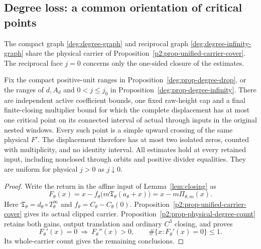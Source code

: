 \subsection{Degree loss: a common orientation of critical points}
\label{sharp:upper-degree-section}

The compact graph \eqref{deg:degree-graph} and reciprocal graph
\eqref{deg:degree-infinity-graph} share the physical carrier of
Proposition~\ref{p2:prop-unified-carrier-cover}. The reciprocal face
\(j=0\) concerns only the one-sided closure of the estimates.

\begin{proposition}
\label{sharp:upper-degree}
Fix the compact positive-unit ranges in
Proposition~\ref{deg:prop-degree-drop}, or the ranges of \(d,A_d\) and
\(0<j\le j_0\) in Proposition~\ref{deg:prop-degree-infinity}.
There are independent active coefficient bounds, one fixed raw-height
cap and a final finite-closing multiplier bound for which the complete
displacement has at most one critical point on its connected interval
of actual through inputs in the original nested windows.
Every such point is a simple upward crossing of the same physical
\(F'\). The displacement therefore has at most two isolated zeros,
counted with multiplicity, and no identity interval.
All estimates hold at every retained input, including nonclosed
through orbits and positive divider equalities. They are uniform for
physical \(j>0\) as \(j\downarrow0\).
\end{proposition}

\begin{proof}
Write the return in the affine input of Lemma~\ref{lem:closing} as
\begin{equation}\label{sharp:upper-degree-displacement}
 F_\theta(x)=x-f_\theta\bigl(m\mathfrak T_\theta(a_\theta+x)\bigr)
             =x-m\Pi_{\theta,m}(x).
\end{equation}
Here $\mathfrak T_\theta=d_\theta\circ T_\theta^\infty$ and
$f_\theta=C_\theta-C_\theta(0)$.
Proposition~\ref{p2:prop-unified-carrier-cover} gives its actual
clipped carrier. Proposition~\ref{p2:prop-physical-degree-count}
retains both gains, output translation and ordinary $C^3$ closing,
and proves
\begin{equation}\label{sharp:upper-degree-critical-orientation}
 F_\theta'(x)=0\ \Longrightarrow\ F_\theta''(x)>0,
 \qquad \#\{x:F_\theta'(x)=0\}\le1.
\end{equation}
Its whole-carrier count gives the remaining conclusions.
\end{proof}
